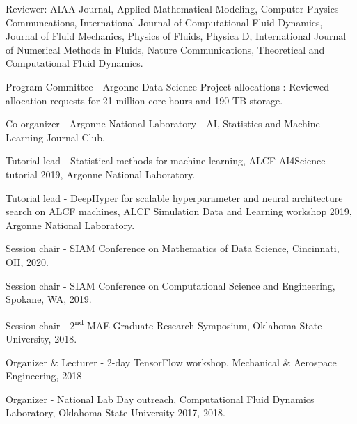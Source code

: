 \documentclass[letterpaper]{article}
\renewenvironment{itemize}{
  \begin{list}{}{
    \setlength{\leftmargin}{1.5em}
  }
}{
  \end{list}
}
\begin{document}
\begin{itemize}
    \item Reviewer: AIAA Journal, Applied Mathematical Modeling, Computer Physics Communcations, International Journal of Computational Fluid Dynamics, Journal of Fluid Mechanics, Physics of Fluids, Physica D, International Journal of Numerical Methods in Fluids, Nature Communications, Theoretical and Computational Fluid Dynamics.
    \item Program Committee - Argonne Data Science Project allocations : Reviewed allocation requests for 21 million core hours and 190 TB storage.
    \item Co-organizer - Argonne National Laboratory - AI, Statistics and Machine Learning Journal Club.
    \item Tutorial lead - Statistical methods for machine learning, ALCF AI4Science tutorial 2019, Argonne National Laboratory.
    \item Tutorial lead - DeepHyper for scalable hyperparameter and neural architecture search on ALCF machines, ALCF Simulation Data and Learning workshop 2019, Argonne National Laboratory.
    \item Session chair - SIAM Conference on Mathematics of Data Science, Cincinnati, OH, 2020.
    \item Session chair - SIAM Conference on Computational Science and Engineering, Spokane, WA, 2019.
    \item Session chair - 2\textsuperscript{nd} MAE Graduate Research Symposium, Oklahoma State University, 2018.
    \item Organizer \& Lecturer - 2-day TensorFlow workshop, Mechanical \& Aerospace Engineering, 2018
    \item Organizer - National Lab Day outreach, Computational Fluid Dynamics Laboratory, Oklahoma State University 2017, 2018.
\end{itemize}

\bigskip

\end{document}
